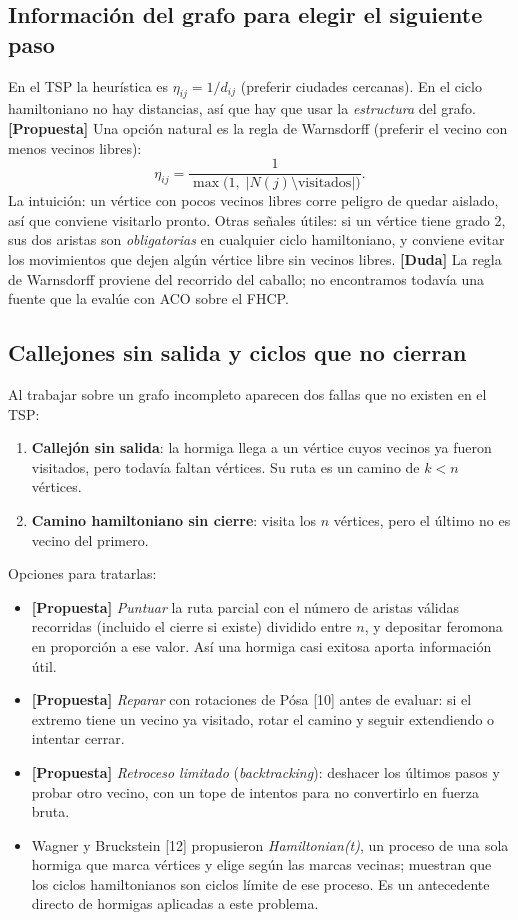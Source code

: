 \documentclass[11pt,letterpaper]{article}
\theoremstyle{definition}
\newcommand{\prop}{\textcolor{green!40!black}{\textbf{[Propuesta]}}}
\newcommand{\duda}{\textcolor{red!60!black}{\textbf{[Duda]}}}
\begin{document}
\subsection{Información del grafo para elegir el siguiente paso}

En el TSP la heurística es $\eta_{ij}=1/d_{ij}$ (preferir ciudades cercanas). En el ciclo
hamiltoniano no hay distancias, así que hay que usar la \emph{estructura} del grafo.
\prop{} Una opción natural es la regla de Warnsdorff (preferir el vecino con menos vecinos
libres):
\[
  \eta_{ij}=\frac{1}{\max\bigl(1,\;|N(j)\setminus\text{visitados}|\bigr)}.
\]
La intuición: un vértice con pocos vecinos libres corre peligro de quedar aislado, así que
conviene visitarlo pronto. Otras señales útiles: si un vértice tiene grado 2, sus dos
aristas son \emph{obligatorias} en cualquier ciclo hamiltoniano, y conviene evitar los
movimientos que dejen algún vértice libre sin vecinos libres. \duda{} La regla de Warnsdorff proviene del recorrido del
caballo; no encontramos todavía una fuente que la evalúe con ACO sobre el FHCP.

\subsection{Callejones sin salida y ciclos que no cierran}

Al trabajar sobre un grafo incompleto aparecen dos fallas que no existen en el TSP:
\begin{enumerate}
  \item \textbf{Callejón sin salida}: la hormiga llega a un vértice cuyos vecinos ya fueron
        visitados, pero todavía faltan vértices. Su ruta es un camino de $k<n$ vértices.
  \item \textbf{Camino hamiltoniano sin cierre}: visita los $n$ vértices, pero el último no
        es vecino del primero.
\end{enumerate}
Opciones para tratarlas:
\begin{itemize}[nosep]
  \item \prop{} \emph{Puntuar} la ruta parcial con el número de aristas válidas recorridas
        (incluido el cierre si existe) dividido entre $n$, y depositar feromona en
        proporción a ese valor. Así una hormiga casi exitosa aporta información útil.
  \item \prop{} \emph{Reparar} con rotaciones de Pósa [10] antes de evaluar: si el extremo
        tiene un vecino ya visitado, rotar el camino y seguir extendiendo o intentar cerrar.
  \item \prop{} \emph{Retroceso limitado} (\emph{backtracking}): deshacer los últimos pasos
        y probar otro vecino, con un tope de intentos para no convertirlo en fuerza bruta.
  \item Wagner y Bruckstein [12] propusieron \emph{Hamiltonian(t)}, un proceso de una sola
        hormiga que marca vértices y elige según las marcas vecinas; muestran que los
        ciclos hamiltonianos son ciclos límite de ese proceso. Es un antecedente directo de
        hormigas aplicadas a este problema.
\end{itemize}
\end{document}
